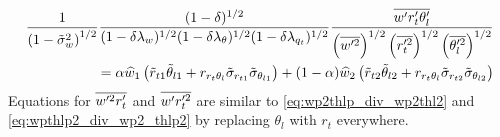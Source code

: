 \begin{align}
    \label{eq:wprtpthlp_div_wp2_thp2_rt2}
    \frac{1}{\left( 1 - \tilde{\sigma}_w^2 \right)^{1/2}}
    \frac{(1-\delta)^{1/2}}
    {(1-\delta \lambda_w)^{1/2} (1-\delta \lambda_\theta)^{1/2}(1-\delta \lambda_{q_t})^{1/2}}
    \frac{\overline{w' r_t' \theta_l'}}
    {\left( \overline{w'^2} \right)^{1/2}\left(\overline{r_t'^2} \right)^{1/2} \left( \overline{\theta_l'^2} \right)^{1/2}} \nonumber \\
    = \alpha \widehat{w}_1 \left(\tilde{r}_{t1} \tilde{\theta}_{l1} +
    r_{r_t \theta_l} \tilde{\sigma}_{r_{t1}} \tilde{\sigma}_{\theta_{l1}} \right) +
    (1-\alpha) \widehat{w}_2 \left(\tilde{r}_{t2} \tilde{\theta}_{l2} +
    r_{r_t \theta_l} \tilde{\sigma}_{r_{t2}} \tilde{\sigma}_{\theta_{l2}} \right)
\end{align}
Equations for $\overline{w'^2 r_t'}$ and $\overline{w' r_t'^2}$ are similar to \cref{eq:wp2thlp_div_wp2thl2}
and \cref{eq:wpthlp2_div_wp2_thlp2} by replacing $\theta_l$ with $r_t$ everywhere.